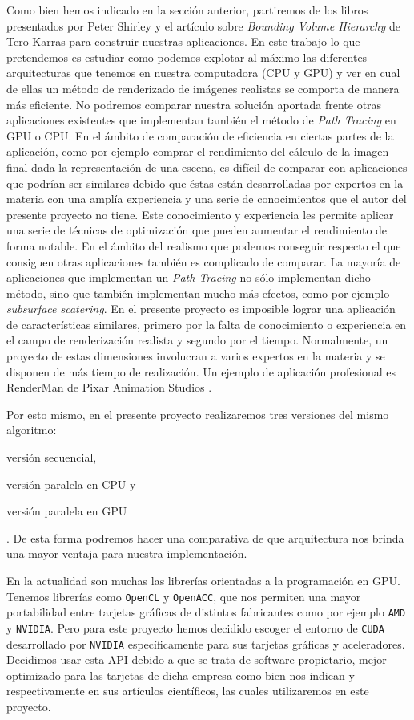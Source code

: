 \documentclass[titlepage,12pt]{report}
\begin{document}
Como bien hemos indicado en la sección anterior, partiremos de los libros presentados por Peter Shirley y el artículo sobre \textit{Bounding Volume Hierarchy} de Tero Karras para construir nuestras aplicaciones. En este trabajo lo que pretendemos es estudiar como podemos explotar al máximo las diferentes arquitecturas que tenemos en nuestra computadora (CPU y GPU) y ver en cual de ellas un método de renderizado de imágenes realistas se comporta de manera más eficiente. No podremos comparar nuestra solución aportada frente otras aplicaciones existentes que implementan también el método de \textit{Path Tracing} en GPU o CPU. En el ámbito de comparación de eficiencia en ciertas partes de la aplicación, como por ejemplo comprar el rendimiento del cálculo de la imagen final dada la representación de una escena, es difícil de comparar con aplicaciones que podrían ser similares debido que éstas están desarrolladas por expertos en la materia con una amplía experiencia y una serie de conocimientos que el autor del presente proyecto no tiene. Este conocimiento y experiencia les permite aplicar una serie de técnicas de optimización que pueden aumentar el rendimiento de forma notable. En el ámbito del realismo que podemos conseguir respecto el que consiguen otras aplicaciones también es complicado de comparar. La mayoría de aplicaciones que implementan un \textit{Path Tracing} no sólo implementan dicho método, sino que también implementan mucho más efectos, como por ejemplo \textit{subsurface scatering}. En el presente proyecto es imposible lograr una aplicación de características similares, primero por la falta de conocimiento o experiencia en el campo de renderización realista y segundo por el tiempo. Normalmente, un proyecto de estas dimensiones involucran a varios expertos en la materia y se disponen de más tiempo de realización. Un ejemplo de aplicación profesional es RenderMan de Pixar Animation Studios \citep{Christensen2018}.

Por esto mismo, en el presente proyecto realizaremos tres versiones del mismo algoritmo: \begin{enumerate*}[label=\roman*)] \item versión secuencial, \item versión paralela en CPU y \item versión paralela en GPU \end{enumerate*}. De esta forma podremos hacer una comparativa de que arquitectura nos brinda una mayor ventaja para nuestra implementación.

En la actualidad son muchas las librerías orientadas a la programación en GPU. Tenemos librerías como \texttt{OpenCL} y \texttt{OpenACC}, que nos permiten una mayor portabilidad entre tarjetas gráficas de distintos fabricantes como por ejemplo \texttt{AMD} y \texttt{NVIDIA}. Pero para este proyecto hemos decidido escoger el entorno de \texttt{CUDA} desarrollado por \texttt{NVIDIA} específicamente para sus tarjetas gráficas y aceleradores. Decidimos usar esta API debido a que se trata de software propietario, mejor optimizado para las tarjetas de dicha empresa como bien nos indican \citep{Karimi2010} y \citep{Fang2011} respectivamente en sus artículos científicos, las cuales utilizaremos en este proyecto.
\end{document}
